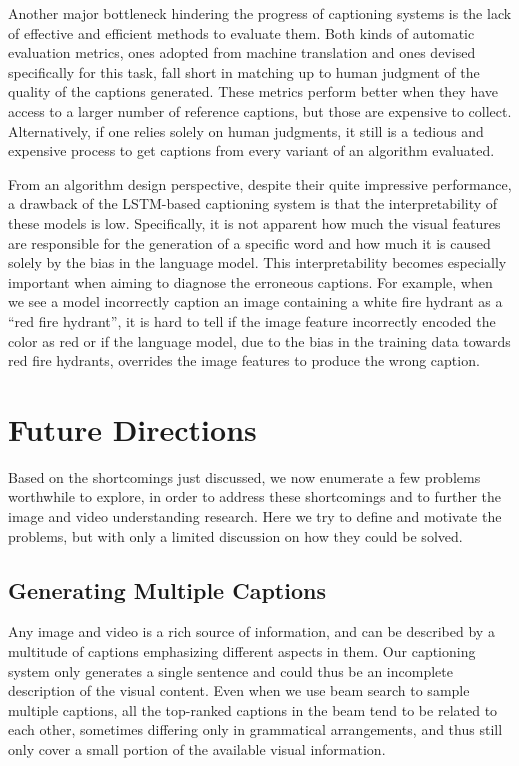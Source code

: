 Another major bottleneck hindering the progress of captioning systems is the
lack of effective and efficient methods to evaluate them.
Both kinds of automatic evaluation metrics, ones adopted from machine
translation and ones devised specifically for this task, fall short in matching
up to human judgment of the quality of the captions generated.
These metrics perform better when they have access to a larger number of
reference captions, but those are expensive to collect.
Alternatively, if one relies solely on human judgments, it still is a tedious
and expensive process to get captions from every variant of an algorithm
evaluated.

From an algorithm design perspective, despite their quite impressive
performance, a drawback of the LSTM-based captioning system is that the
interpretability of these models is low.
Specifically, it is not apparent how much the visual features are responsible
for the generation of a specific word and how much it is caused solely by the
bias in the language model.
This interpretability becomes especially important when aiming to diagnose the
erroneous captions.
For example, when we see a model incorrectly caption an image containing a white
fire hydrant as a ``red fire hydrant'', it is hard to tell if the image feature
incorrectly encoded the color as red or if the language model, due to the bias
in the training data towards red fire hydrants, overrides the image features to
produce the wrong caption.  

\section{Future Directions}
Based on the shortcomings just discussed, we now enumerate a few problems
worthwhile to explore, in order to address these shortcomings and to further the
image and video understanding research.
Here we try to define and motivate the problems, but with only a limited
discussion on how they could be solved.

\subsection{Generating Multiple Captions} Any image and video is a rich source
of information, and can be described by a multitude of captions emphasizing
different aspects in them. 
Our captioning system only generates a single sentence and could thus be an
incomplete description of the visual content.
Even when we use beam search to sample multiple captions, all the top-ranked
captions in the beam tend to be related to each other, sometimes differing only
in grammatical arrangements, and thus still only cover a small portion of the
available visual information.

